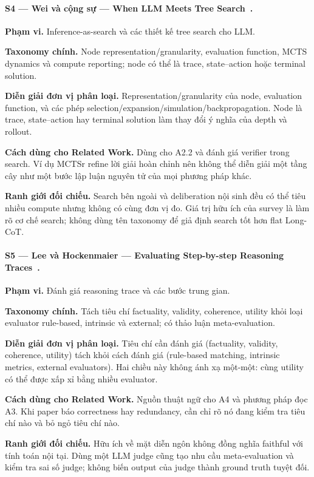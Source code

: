 \paragraph{S4 — Wei và cộng sự — When LLM Meets Tree Search~\cite{survey_wei2026treesearch}.}
\noindent\textbf{Phạm vi.} Inference-as-search và các thiết kế tree search cho LLM.\par
\noindent\textbf{Taxonomy chính.} Node representation/granularity, evaluation function, MCTS dynamics và compute reporting; node có thể là trace, state–action hoặc terminal solution.\par
\noindent\textbf{Diễn giải đơn vị phân loại.} Representation/granularity của node, evaluation function, và các phép selection/expansion/simulation/backpropagation. Node là trace, state–action hay terminal solution làm thay đổi ý nghĩa của depth và rollout.\par
\noindent\textbf{Cách dùng cho Related Work.} Dùng cho A2.2 và đánh giá verifier trong search. Ví dụ MCTSr refine lời giải hoàn chỉnh nên không thể diễn giải một tầng cây như một bước lập luận nguyên tử của mọi phương pháp khác.\par
\noindent\textbf{Ranh giới đối chiếu.} Search bên ngoài và deliberation nội sinh đều có thể tiêu nhiều compute nhưng không có cùng đơn vị đo. Giá trị hữu ích của survey là làm rõ cơ chế search; không dùng tên taxonomy để giả định search tốt hơn flat Long-CoT.\par
{}

\paragraph{S5 — Lee và Hockenmaier — Evaluating Step-by-step Reasoning Traces~\cite{survey_lee2025evaluating}.}
\noindent\textbf{Phạm vi.} Đánh giá reasoning trace và các bước trung gian.\par
\noindent\textbf{Taxonomy chính.} Tách tiêu chí factuality, validity, coherence, utility khỏi loại evaluator rule-based, intrinsic và external; có thảo luận meta-evaluation.\par
\noindent\textbf{Diễn giải đơn vị phân loại.} Tiêu chí cần đánh giá (factuality, validity, coherence, utility) tách khỏi cách đánh giá (rule-based matching, intrinsic metrics, external evaluators). Hai chiều này không ánh xạ một-một: cùng utility có thể được xấp xỉ bằng nhiều evaluator.\par
\noindent\textbf{Cách dùng cho Related Work.} Nguồn thuật ngữ cho A4 và phương pháp đọc A3. Khi paper báo correctness hay redundancy, cần chỉ rõ nó đang kiểm tra tiêu chí nào và bỏ ngỏ tiêu chí nào.\par
\noindent\textbf{Ranh giới đối chiếu.} Hữu ích về mặt diễn ngôn không đồng nghĩa faithful với tính toán nội tại. Dùng một LLM judge cũng tạo nhu cầu meta-evaluation và kiểm tra sai số judge; không biến output của judge thành ground truth tuyệt đối.\par
{}

